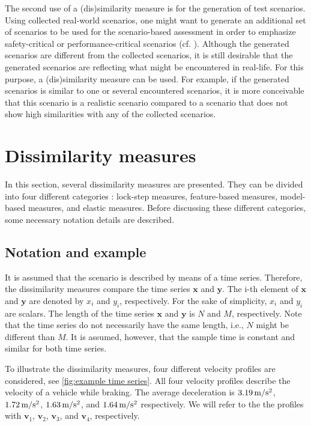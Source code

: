 \documentclass[10pt,final,a4paper,oneside,onecolumn]{article}
\newcommand{\profile}[1]{\textbf{v}_{#1}}
\theoremstyle{plain}\newtheorem{definition}{Definition}[section]    %
\theoremstyle{definition}\newtheorem{example}{Example}[section]     %
\theoremstyle{remark}\newtheorem{remarkenv}{Remark}[section]        %
\begin{document}
The second use of a (dis)similarity measure is for the generation of test scenarios. Using collected real-world scenarios, one might want to generate an additional set of scenarios to be used for the scenario-based assessment in order to emphasize safety-critical or performance-critical scenarios (cf. \cite{zofka2015datadrivetrafficscenarios, deGelder2017assessment}). Although the generated scenarios are different from the collected scenarios, it is still desirable that the generated scenarios are reflecting what might be encountered in real-life. For this purpose, a (dis)similarity measure can be used. For example, if the generated scenarios is similar to one or several encountered scenarios, it is more conceivable that this scenario is a realistic scenario compared to a scenario that does not show high similarities with any of the collected scenarios. 


\section{Dissimilarity measures}
\label{sec:dissimilarity}

In this section, several dissimilarity measures are presented. They can be divided into four different categories \cite{serra2014empirical}: lock-step measures, feature-based measures, model-based measures, and elastic measures. Before discussing these different categories, some necessary notation details are described.

\subsection{Notation and example}
\label{sec:dissimilarity notation}

It is assumed that the scenario is described by means of a time series. Therefore, the dissimilarity measures compare the time series $\textbf{x}$ and $\textbf{y}$. The i-th element of $\textbf{x}$ and $\textbf{y}$ are denoted by $x_i$ and $y_i$, respectively. For the sake of simplicity, $x_i$ and $y_i$ are scalars. The length of the time series $\textbf{x}$ and $\textbf{y}$ is $N$ and $M$, respectively. Note that the time series do not necessarily have the same length, i.e., $N$ might be different than $M$. It is assumed, however, that the sample time is constant and similar for both time series.

To illustrate the dissimilarity measures, four different velocity profiles are considered, see \cref{fig:example time series}. All four velocity profiles describe the velocity of a vehicle while braking. The average deceleration is $\unit[3.19]{m/s^2}$, $\unit[1.72]{m/s^2}$, $\unit[1.63]{m/s^2}$, and $\unit[1.64]{m/s^2}$ respectively. We will refer to the the profiles with $\profile{1}$, $\profile{2}$, $\profile{3}$, and $\profile{4}$, respectively. 
\end{document}
